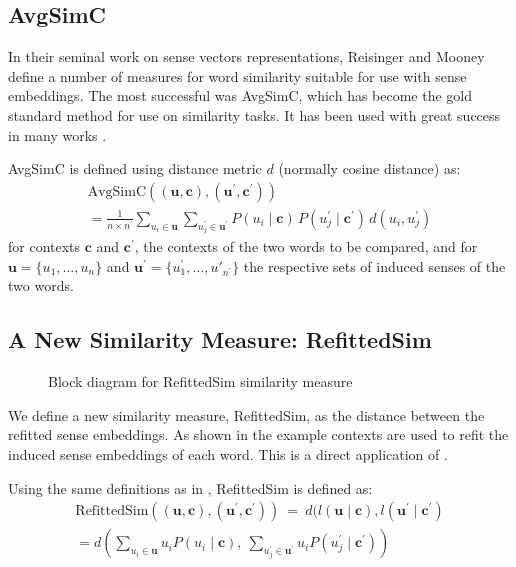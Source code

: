 \documentclass{llncs}
\def\parencite{\cite}
\renewcommand{\c}{\mathbf{c}}
\renewcommand{\u}{\mathbf{u}}
\begin{document}
\subsection{AvgSimC}
In their seminal work on sense vectors representations, Reisinger and Mooney \parencite{Reisinger2010} define a number of measures for word similarity suitable for use with sense embeddings.
The most successful was AvgSimC, which has become the gold standard method for use on similarity tasks. It has been used with great success in many works \cite{Huang2012,Chen2014,tian2014probabilistic}. 


AvgSimC is defined using distance metric $d$ (normally cosine distance) as: 
\begin{multline} \label{eq:avgsimc}
\mathrm{AvgSimC}((\u,\c),(\u^{\prime},\c^{\prime})) \\
=  \frac{1}{n \times n^{\prime}}
\sum_{u_{i}\in\u}
\sum_{u_{j}^{\prime}\in\u^{\prime}}
P(u_{i}\mid\c)\,P(u_{j}^{\prime}\mid\c^{\prime})\,d(u_{i},u_{j}^{\prime})
\end{multline}
for contexts $\c$ and $\c^\prime$, the contexts of the two words to be compared, and for $\u=\{u_1,...,u_n\}$ and $\u^\prime=\{u^\prime_1,...,u\prime_{n^\prime}\}$ the respective sets of induced senses of the two words.


\subsection{A New Similarity Measure: RefittedSim}\label{RefittedSimVsAvgSimC}
\begin{figure}
	\begin{adjustbox}{max width=\columnwidth}
	
	\end{adjustbox}
	\caption{Block diagram for RefittedSim similarity measure} \label{diaRefittedSim}
\end{figure}
We define a new similarity measure, RefittedSim, as the distance between the refitted sense embeddings.
As shown in  the example contexts are used to refit the induced sense embeddings of each word.
This is a direct application of  .

Using the same definitions as in , RefittedSim is defined as:
\begin{multline} \label{eq:refittedsim}
\mathrm{RefittedSim}((\u,\c),(\u^{\prime},\c^{\prime}))
\:=\: d(l(\u \mid \c), l(\u^\prime \mid \c^\prime)\\
= d\left(
\sum_{u_{i}\in\u}u_{i}P(u_{i}\mid\c),\:
\sum_{u_{j}^{\prime}\in\u^{\prime}}u_{i}P(u_{j}^{\prime}\mid\c^{\prime})\right)
\end{multline}
\end{document}
